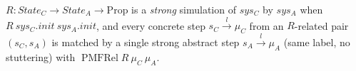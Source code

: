 \begin{definition}
  \label{def:strongsim}
  \leanok
  $R : State_C \to State_A \to \mathrm{Prop}$ is a \emph{strong} simulation of $sys_C$ by $sys_A$ when $R\ sys_C.init\ sys_A.init$, and every concrete step $s_C \xrightarrow{l} \mu_C$ from an $R$-related pair $(s_C, s_A)$ is matched by a single strong abstract step $s_A \xrightarrow{l} \mu_A$ (same label, no stuttering) with $\operatorname{PMFRel} R\ \mu_C\ \mu_A$.
\end{definition}

